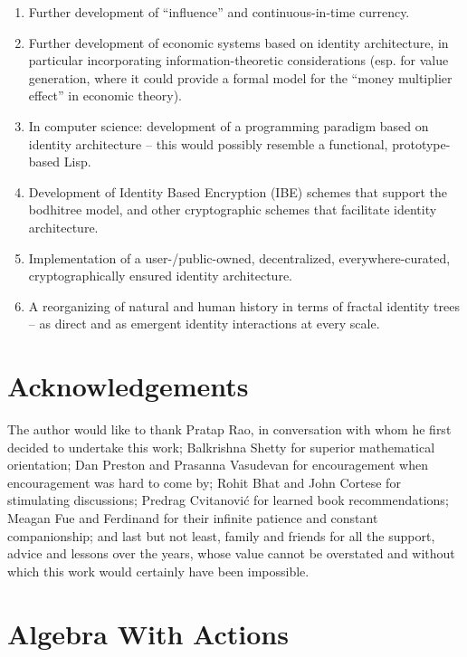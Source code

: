 \documentclass[pra,twocolumn,groupedaddress,10pt]{revtex4}
\theoremstyle{definition}
\begin{document}
\begin{enumerate}
	\item Further development of ``influence'' and continuous-in-time currency.
	\item Further development of economic systems based on identity architecture, in particular incorporating information-theoretic considerations (esp. for value generation, where it could provide a formal model for the ``money multiplier effect'' in economic theory).
	\item In computer science: development of a programming paradigm based on identity architecture -- this would possibly resemble a functional, prototype-based Lisp.
	\item Development of Identity Based Encryption (IBE) schemes that support the bodhitree model, and other cryptographic schemes that facilitate identity architecture.
	\item Implementation of a user-/public-owned, decentralized, everywhere-curated, cryptographically ensured identity architecture.
	\item A reorganizing of natural and human history in terms of fractal identity trees -- as direct and as emergent identity interactions at every scale.
\end{enumerate}

\section{Acknowledgements} \label{sec:acknowledgements}

The author would like to thank Pratap Rao, in conversation with whom he first decided to undertake this work; Balkrishna Shetty for superior mathematical orientation; Dan Preston and Prasanna Vasudevan for encouragement when encouragement was hard to come by; Rohit Bhat and John Cortese for stimulating discussions; Predrag Cvitanovi\'{c} for learned book recommendations; Meagan Fue and Ferdinand for their infinite patience and constant companionship; and last but not least, family and friends for all the support, advice and lessons over the years, whose value cannot be overstated and without which this work would certainly have been impossible.




\appendix

\section{Algebra With Actions} \label{app:algact}
\end{document}
